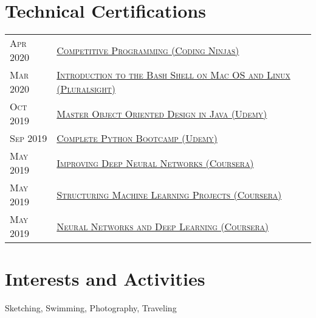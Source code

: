 \documentclass[a4paper,10pt]{article} %
\begin{document}
\section{Technical Certifications}

\begin{tabular}{ll}
\textsc{Apr 2020} & \href{https://ninjasfiles.s3.amazonaws.com/certificate643308086b235198c8d9aa73fa674fe417597e.pdf}{\textsc{Competitive Programming (Coding Ninjas)}}\\
\textsc{Mar 2020} & \href{https://vaibhavkasturia.com/certificate/introduction-to-the-bash-shell-on-macos-and-linux-vaibhav-kasturia.pdf}{\textsc{Introduction to the Bash Shell on Mac OS and Linux (Pluralsight)}}\\
\textsc{Oct 2019} & \href{https://www.udemy.com/certificate/UC-1EV6KK7F/}{\textsc{Master Object Oriented Design in Java (Udemy)}}\\
\textsc{Sep 2019} & \href{https://www.udemy.com/certificate/UC-P7AJYXY6/}{\textsc{Complete Python Bootcamp (Udemy)}}\\
\textsc{May 2019} & \href{https://www.coursera.org/account/accomplishments/verify/XN25BG7WGAM3}{\textsc{Improving Deep Neural Networks (Coursera)}}\\
\textsc{May 2019} & \href{https://www.coursera.org/account/accomplishments/certificate/LWCFY27WJB9R}{\textsc{Structuring Machine Learning Projects (Coursera)}}\\
\textsc{May 2019} & \href{https://www.coursera.org/account/accomplishments/verify/KCVQACF5SKEM}{\textsc{Neural Networks and Deep Learning (Coursera)}}\\
\end{tabular}


\section{Interests and Activities}

Sketching, Swimming, Photography, Traveling

\newpage
\enlargethispage{6\baselineskip}
\end{document}
